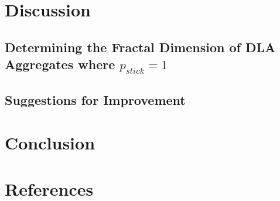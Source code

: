 \documentclass[11pt]{iopart}
\begin{document}
\section{Discussion}
\subsection{Determining the Fractal Dimension of DLA Aggregates where $p_{stick} = 1$}
\subsection{Suggestions for Improvement}

\section{Conclusion}

\section*{References}


\end{document}
